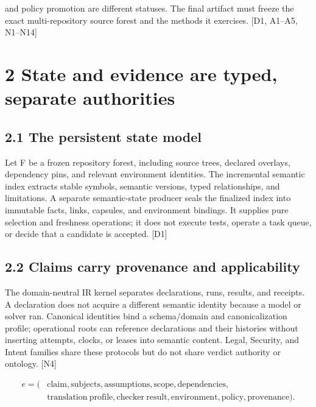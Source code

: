 and policy promotion are different statuses. The final artifact must freeze the exact multi-repository
source forest and the methods it exercises. [D1, A1–A5, N1–N14]


\section*{2 State and evidence are typed, separate authorities}

\subsection*{2.1 The persistent state model}

Let F be a frozen repository forest, including source trees, declared overlays, dependency pins, and
relevant environment identities. The incremental semantic index extracts stable symbols, semantic
versions, typed relationships, and limitations. A separate semantic-state producer seals the finalized
index into immutable facts, links, capsules, and environment bindings. It supplies pure selection and
freshness operations; it does not execute tests, operate a task queue, or decide that a candidate is
accepted. [D1]

\subsection*{2.2 Claims carry provenance and applicability}

The domain-neutral IR kernel separates declarations, runs, results, and receipts. A declaration does
not acquire a different semantic identity because a model or solver ran. Canonical identities bind a
schema/domain and canonicalization profile; operational roots can reference declarations and their
histories without inserting attempts, clocks, or leases into semantic content. Legal, Security, and
Intent families share these protocols but do not share verdict authority or ontology. [N4]


\setcounter{equation}{0}
\begin{equation}\begin{aligned}
e = (&\mathrm{claim},\mathrm{subjects},\mathrm{assumptions},\mathrm{scope},\mathrm{dependencies},\\
&\mathrm{translation\ profile},\mathrm{checker\ result},\mathrm{environment},\mathrm{policy},\mathrm{provenance}).
\end{aligned}\tag{1}\end{equation}

